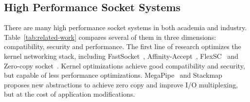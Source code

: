 



\subsection{High Performance Socket Systems}
\label{subsec:related-work}


There are many high performance socket systems in both academia and industry.
Table~\ref{tab:related-work} compares several of them in three dimensions: compatibility, security and performance.
The first line of research optimizes the kernel networking stack, including FastSocket~\cite{lin2016scalable}, Affinity-Accept~\cite{pesterev2012improving}, FlexSC~\cite{soares2010flexsc} and Zero-copy socket~\cite{thadani1995efficient,chu1996zero}.
Kernel optimizations achieve good compatibility and security, but capable of less performance optimizations.
MegaPipe~\cite{han2012megapipe} and Stackmap~\cite{yasukata2016stackmap} proposes new abstractions to achieve zero copy and improve I/O multiplexing, but at the cost of application modifications.

